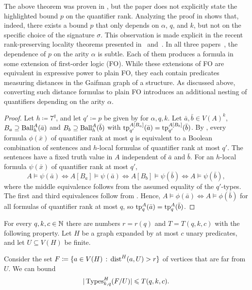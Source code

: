 The above theorem was proven in \cite{gaifman}, but the paper does not explicitly state the highlighted bound $p$ on the quantifier rank.
Analyzing the proof in \cite{gaifman} shows that, indeed, there exists a bound $p$ that only depends on $\alpha$, $q$, and $k$, but not on the specific choice of the signature $\sigma$.
This observation is made explicit in the recent rank-preserving locality theorems presented in~\cite{locality-note} and~\cite{vanbergerem2026rank}.
In all three papers~\cite{gaifman,locality-note,vanbergerem2026rank}, the dependence of $p$ on the arity $\alpha$ is subtle.
Each of them produces a formula in some extension of first-order logic (FO).
While these extensions of FO are equivalent in expressive power to plain FO, they each contain predicates measuring distances in the Gaifman graph of a structure.
As discussed above, converting such distance formulas to plain FO introduces an additional nesting of quantifiers depending on the arity $\alpha$.




\lemLocalToGlobal*

\begin{proof}
Let $h\coloneqq 7^q$, and let $q'\coloneqq p$ be given by  for $\alpha,q,k$.
Let $\bar a,\bar b\in V(A)^k$, $B_a\supseteq \operatorname{Ball}_h^A(\bar a)$ and $B_b\supseteq \operatorname{Ball}_h^A(\bar b)$ with $\textnormal{tp}_{q'}^{A[B_a]}(\bar a)=\textnormal{tp}_{q'}^{A[B_b]}(\bar b)$.
By , every formula $\phi(\bar x)$ of quantifier rank at most $q$ is equivalent to a Boolean combination of sentences and $h$-local formulas of quantifier rank at most $q'$.
The sentences have a fixed truth value in $A$ independent of $\bar a$ and $\bar b$.
For an $h$-local formula $\psi(\bar x)$ of quantifier rank at most $q'$,
\[
  A\models\psi(\bar a)
  \iff
  A[B_a]\models\psi(\bar a)
  \iff
  A[B_b]\models\psi(\bar b)
  \iff
  A\models\psi(\bar b),
\]
where the middle equivalence follows from the assumed equality of the $q'$-types.
The first and third equivalences follow from .
Hence, $A\models\phi(\bar a)\iff A\models\phi(\bar b)$ for all formulas of quantifier rank at most $q$, so $\textnormal{tp}_q^A(\bar a)=\textnormal{tp}_q^A(\bar b)$.
\end{proof}


  

\begin{lemma}\label{lem:sep-types}
    For every $q,k,c\in\mathbb N$ there are numbers $r=r(q)$ and $T=T(q,k,c)$ with the following property. Let $H$ be a graph expanded by at most $c$ unary predicates, and let $U\subseteq V(H)$ be finite.

    Consider the set $F \coloneqq \{a\in V(H) \,:\, \mathrm{dist}^H(a,U) > r\}$ of vertices that are far from $U$. We can bound
    \[
      |\operatorname{Types}^H_{k,q}(F/U)|\leqslant T(q,k,c).
    \]
\end{lemma}


